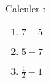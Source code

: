 
\begin{mental}
    Calculer :
    \begin{enumerate}
        \item
            \( 7-5\)
        \item
            \( 5-7\)
        \item
            \( \frac{ 1 }{2}-1\)
    \end{enumerate}

    \vspace{2cm}

\begin{center}
   
\end{center}

\end{mental}
